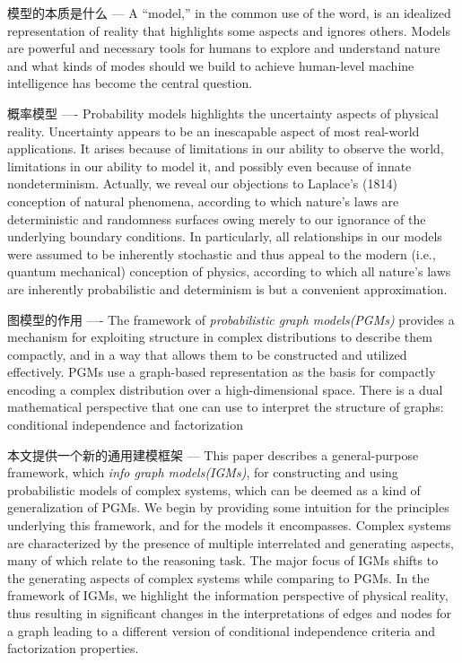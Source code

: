 \documentclass[10pt,onecolumn,letterpaper]{article}
\begin{document}
\begin{CJK*}{UTF8}{gbsn}
模型的本质是什么 ---
A “model,” in the common use of the word, is an idealized representation of reality that highlights some aspects and ignores others\cite{Pearl2009}.
Models are powerful and necessary tools for humans to explore and understand nature and what kinds of modes should we build to achieve human-level machine intelligence has become the central question.

概率模型 ----
Probability models highlights the uncertainty aspects of physical reality. Uncertainty appears to be an inescapable aspect of most real-world applications. It arises because of limitations in our ability to observe the world, limitations in our ability to model it, and possibly even because of innate nondeterminism. Actually, we reveal our objections to Laplace’s (1814) conception of natural phenomena, according to which nature’s laws are deterministic and randomness surfaces owing merely to our ignorance of the underlying boundary conditions. In particularly, all relationships in our models were assumed to be inherently stochastic and thus appeal to the modern (i.e., quantum mechanical) conception of physics, according to which all nature’s laws are inherently probabilistic and determinism is but a convenient approximation.

图模型的作用 ----
The framework of \emph{probabilistic graph models(PGMs)} provides a mechanism for exploiting structure in complex distributions to describe them compactly, and in a way that allows them to be constructed and utilized effectively. PGMs use a graph-based representation as the basis for compactly encoding a complex distribution over a high-dimensional space. There is a dual mathematical perspective that one can use to interpret the structure of graphs: conditional independence and factorization\cite{koller2009probabilistic}

本文提供一个新的通用建模框架 ---
This paper describes a general-purpose framework, which \emph{info graph models(IGMs)}, for constructing and using probabilistic models of complex systems, which can be deemed as a kind of generalization of PGMs. We begin by providing some intuition for the principles underlying this framework, and for the models it encompasses. Complex systems are characterized by the presence of multiple interrelated and generating aspects, many of which relate to the reasoning task. The major focus of IGMs shifts to the generating aspects of complex systems while comparing to PGMs. In the framework of IGMs, we highlight the information perspective of physical reality, thus resulting in significant changes in the interpretations of edges and nodes for a graph leading to a different version of conditional independence criteria and factorization properties.


\end{CJK*}
\end{document}

